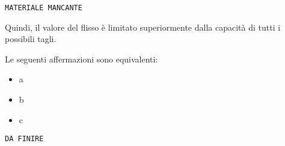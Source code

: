 \texttt{MATERIALE MANCANTE}

Quindi, il valore del flisso è limitato superiormente dalla capacità di tutti i possibili tagli.

\begin{theorem}
Le seguenti affermazioni sono equivalenti:
\begin{itemize}
	\item a
	\item b
	\item c
\end{itemize}
\end{theorem}

\texttt{DA FINIRE}

\ifsubfile

\fi
